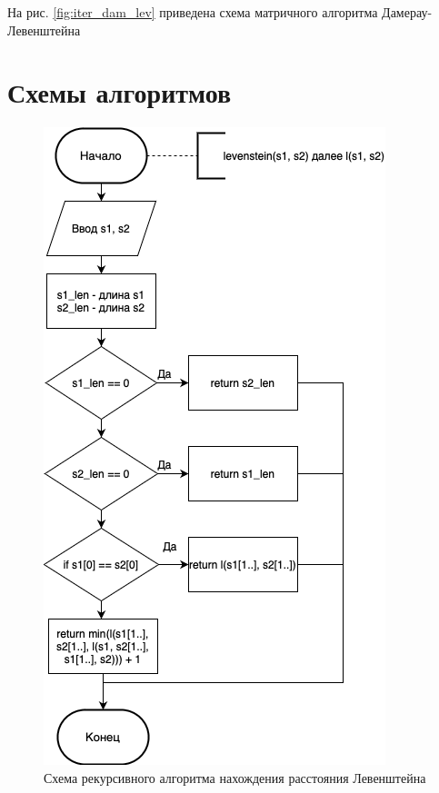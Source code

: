 \documentclass[12pt]{report}
\begin{document}
На рис. \ref{fig:iter_dam_lev} приведена схема матричного алгоритма Дамерау-Левенштейна

\section{Схемы алгоритмов}

\begin{figure}[h]
	\centering
	\includegraphics[scale=0.9]{lev_rec.png}
	\caption{Схема рекурсивного алгоритма нахождения расстояния Левенштейна}
	\label{fig:rec_lev}
\end{figure}
\end{document}
